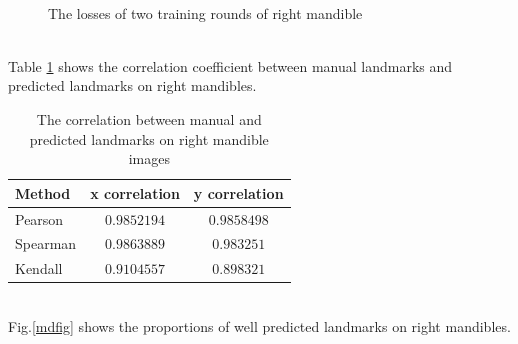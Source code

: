 \documentclass[12pt,a4paper]{article}
\begin{document}
\begin{figure}[h!]
\centering
{}~~
\caption{The losses of two training rounds of right mandible  }
\label{lossmdcurves}
\end{figure}~\\
Table \ref{corrmd} shows the correlation coefficient between manual landmarks and predicted landmarks on right mandibles.\\[0.1cm]
\begin{table}[h!]
	\centering
	\begin{tabular}{l c c}
		Method & x correlation & y correlation \\ \hline
		Pearson & $0.9852194$ & $0.9858498$ \\ \hline
		Spearman & $0.9863889$ & $0.983251$ \\ \hline
		Kendall & $0.9104557$ & $0.898321$ \\ \hline
	\end{tabular}
	\caption{The correlation between manual and predicted landmarks on right mandible images}
	\label{corrmd}
\end{table}~\\
Fig.\ref{mdfig} shows the proportions of well predicted landmarks on right mandibles.
\end{document}
